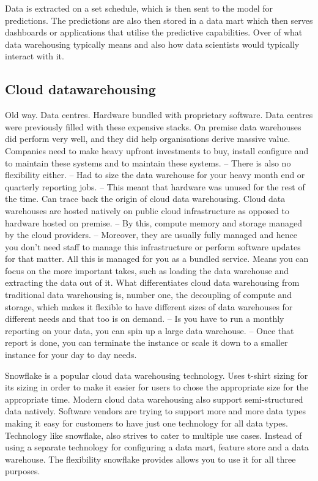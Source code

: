 \documentclass[a4paper, 11pt]{article}
\begin{document}
    Data is extracted on a set schedule, which is then sent to the model for predictions.
    The predictions are also then stored in a data mart which then serves dashboards or applications that utilise the predictive capabilities.
    Over of what data warehousing typically means and also how data scientists would typically interact with it.

    \subsection{Cloud datawarehousing}

    Old way. Data centres. Hardware bundled with proprietary software.
    Data centres were previously filled with these expensive stacks.
    On premise data warehouses did perform very well, and they did help organisations derive massive value.
    Companies need to make heavy upfront investments to buy, install configure and to maintain these systems and to maintain these systems.
    -- There is also no flexibility either.
    -- Had to size the data warehouse for your heavy month end or quarterly reporting jobs.
    -- This meant that hardware was unused for the rest of the time.
    Can trace back the origin of cloud data warehousing.
    Cloud data warehouses are hosted natively on public cloud infrastructure as opposed to hardware hosted on premise.
    -- By this, compute memory and storage managed by the cloud providers.
    -- Moreover, they are usually fully managed and hence you don't need staff to manage this infrastructure or perform software updates for that matter.
    All this is managed for you as a bundled service.
    Means you can focus on the more important takes, such as loading the data warehouse and extracting the data out of it.
    What differentiates cloud data warehousing from traditional data warehousing is, number one, the decoupling of compute and storage, which makes it flexible to have different sizes of data warehouses for different needs and that too is on demand.
    -- Is you have to run a monthly reporting on your data, you can spin up a large data warehouse.
    -- Once that report is done, you can terminate the instance or scale it down to a smaller instance for your day to day needs.

    Snowflake is a popular cloud data warehousing technology.
    Uses t-shirt sizing for its sizing in order to make it easier for users to chose the appropriate size for the appropriate time.
    Modern cloud data warehousing also support semi-structured data natively.
    Software vendors are trying to support more and more data types making it easy for customers to have just one technology for all data types.
    Technology like snowflake, also strives to cater to multiple use cases.
    Instead of using a separate technology for configuring a data mart, feature store and a data warehouse.
    The flexibility snowflake provides allows you to use it for all three purposes.
\end{document}
